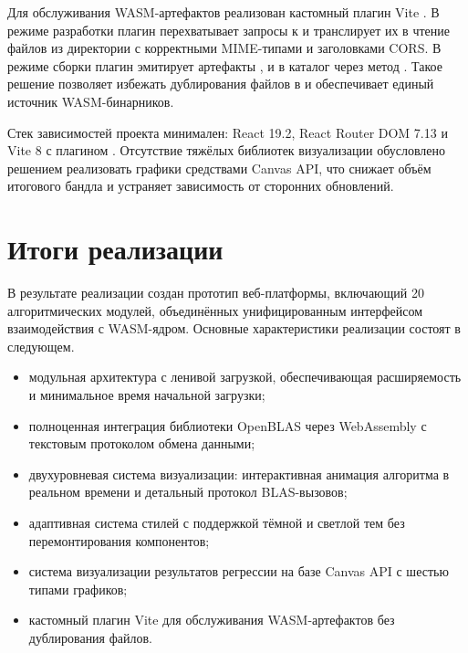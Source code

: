 \documentclass[12pt, oneside]{book}
\begin{document}
    \quad Для обслуживания WASM-артефактов реализован кастомный плагин Vite \texttt{}. В режиме разработки плагин перехватывает запросы к \texttt{} и транслирует их в чтение файлов из директории \texttt{} с корректными MIME-типами и заголовками CORS. В режиме сборки плагин эмитирует артефакты \texttt{}, \texttt{} и \texttt{} в каталог \texttt{} через метод \texttt{}. Такое решение позволяет избежать дублирования файлов в \texttt{} и обеспечивает единый источник WASM-бинарников.

    \quad Стек зависимостей проекта минимален: React 19.2, React Router DOM 7.13 и Vite 8 с плагином \texttt{}. Отсутствие тяжёлых библиотек визуализации обусловлено решением реализовать графики средствами Canvas API, что снижает объём итогового бандла и устраняет зависимость от сторонних обновлений.

\section{Итоги реализации}

    \quad В результате реализации создан прототип веб-платформы, включающий 20 алгоритмических модулей, объединённых унифицированным интерфейсом взаимодействия с WASM-ядром. Основные характеристики реализации состоят в следующем.

\begin{itemize}
    \item модульная архитектура с ленивой загрузкой, обеспечивающая расширяемость и минимальное время начальной загрузки;
    \item полноценная интеграция библиотеки OpenBLAS через WebAssembly с текстовым протоколом обмена данными;
    \item двухуровневая система визуализации: интерактивная анимация алгоритма в реальном времени и детальный протокол BLAS-вызовов;
    \item адаптивная система стилей с поддержкой тёмной и светлой тем без перемонтирования компонентов;
    \item система визуализации результатов регрессии на базе Canvas API с шестью типами графиков;
    \item кастомный плагин Vite для обслуживания WASM-артефактов без дублирования файлов.
\end{itemize}
\end{document}

